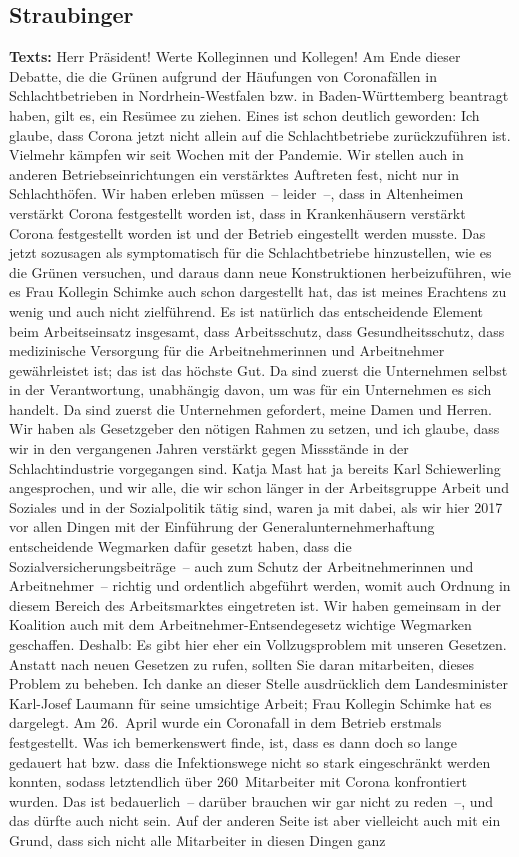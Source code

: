 \documentclass{article}
\begin{document}
\subsection{Straubinger}
\noindent\textbf{Texts:} Herr Präsident! Werte Kolleginnen und Kollegen! Am Ende dieser Debatte, die die Grünen aufgrund der Häufungen von Coronafällen in Schlachtbetrieben in Nordrhein-Westfalen bzw. in Baden-Württemberg beantragt haben, gilt es, ein Resümee zu ziehen. Eines ist schon deutlich geworden: Ich glaube, dass Corona jetzt nicht allein auf die Schlachtbetriebe zurückzuführen ist.  Vielmehr kämpfen wir seit Wochen mit der Pandemie. Wir stellen auch in anderen Betriebseinrichtungen ein verstärktes Auftreten fest, nicht nur in Schlachthöfen. Wir haben erleben müssen – leider –, dass in Altenheimen verstärkt Corona festgestellt worden ist, dass in Krankenhäusern verstärkt Corona festgestellt worden ist und der Betrieb eingestellt werden musste.  Das jetzt sozusagen als symptomatisch für die Schlachtbetriebe hinzustellen, wie es die Grünen versuchen,  und daraus dann neue Konstruktionen herbeizuführen, wie es Frau Kollegin Schimke auch schon dargestellt hat, das ist meines Erachtens zu wenig und auch nicht zielführend.  Es ist natürlich das entscheidende Element beim Arbeitseinsatz insgesamt, dass Arbeitsschutz, dass Gesundheitsschutz, dass medizinische Versorgung für die Arbeitnehmerinnen und Arbeitnehmer gewährleistet ist; das ist das höchste Gut. Da sind zuerst die Unternehmen selbst in der Verantwortung, unabhängig davon, um was für ein Unternehmen es sich handelt. Da sind zuerst die Unternehmen gefordert, meine Damen und Herren.  Wir haben als Gesetzgeber den nötigen Rahmen zu setzen, und ich glaube, dass wir in den vergangenen Jahren verstärkt gegen Missstände in der Schlachtindustrie vorgegangen sind. Katja Mast hat ja bereits Karl Schiewerling angesprochen, und wir alle, die wir schon länger in der Arbeitsgruppe Arbeit und Soziales und in der Sozialpolitik tätig sind, waren ja mit dabei, als wir hier 2017 vor allen Dingen mit der Einführung der Generalunternehmerhaftung entscheidende Wegmarken dafür gesetzt haben, dass die Sozialversicherungsbeiträge – auch zum Schutz der Arbeitnehmerinnen und Arbeitnehmer – richtig und ordentlich abgeführt werden, womit auch Ordnung in diesem Bereich des Arbeitsmarktes eingetreten ist. Wir haben gemeinsam in der Koalition auch mit dem Arbeitnehmer-Entsendegesetz wichtige Wegmarken geschaffen. Deshalb: Es gibt hier eher ein Vollzugsproblem mit unseren Gesetzen.  Anstatt nach neuen Gesetzen zu rufen, sollten Sie daran mitarbeiten, dieses Problem zu beheben. Ich danke an dieser Stelle ausdrücklich dem Landesminister Karl-Josef Laumann für seine umsichtige Arbeit; Frau Kollegin Schimke hat es dargelegt. Am 26. April wurde ein Coronafall in dem Betrieb erstmals festgestellt. Was ich bemerkenswert finde, ist, dass es dann doch so lange gedauert hat bzw. dass die Infektionswege nicht so stark eingeschränkt werden konnten, sodass letztendlich über 260 Mitarbeiter mit Corona konfrontiert wurden. Das ist bedauerlich – darüber brauchen wir gar nicht zu reden –, und das dürfte auch nicht sein.  Auf der anderen Seite ist aber vielleicht auch mit ein Grund, dass sich nicht alle Mitarbeiter in diesen Dingen ganz 
\end{document}
